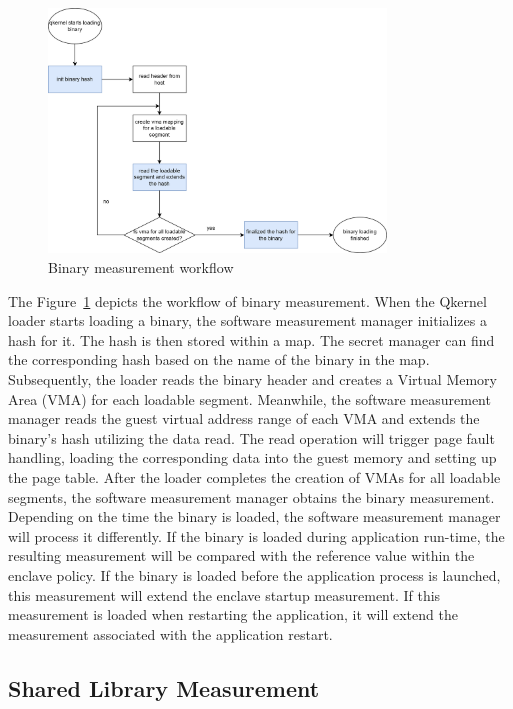 \begin{figure}[!htb]
    \centering
    \includegraphics[width=0.8\textwidth]{images/measure_binary.png}
    \caption[Binary measurement workflow]{Binary measurement workflow}
    \label{fig:binary_measurement}
\end{figure}


The Figure~\ref{fig:binary_measurement} depicts the workflow of binary measurement. When the Qkernel loader starts loading a binary, the software measurement manager initializes a hash for it. The hash is then stored within a map. The secret manager can find the corresponding hash based on the name of the binary in the map. 
Subsequently, the loader reads the binary header and creates a Virtual Memory Area (VMA) for each loadable segment. Meanwhile, the software measurement manager reads the guest virtual address range of each VMA and extends the binary's hash utilizing the data read.
The read operation will trigger page fault handling, loading the corresponding data into the guest memory and setting up the page table. After the loader completes the creation of VMAs for all loadable segments, the software measurement manager obtains the binary measurement. Depending on the time the 
binary is loaded, the software measurement manager will process it differently. If the binary is loaded during application run-time, the resulting measurement will be compared with the reference value within the enclave policy. If the binary is loaded before the application process is launched, this 
measurement will extend the enclave startup measurement. If this measurement is loaded when restarting the application, it will extend the measurement associated with the application restart.

\subsection{Shared Library Measurement}

